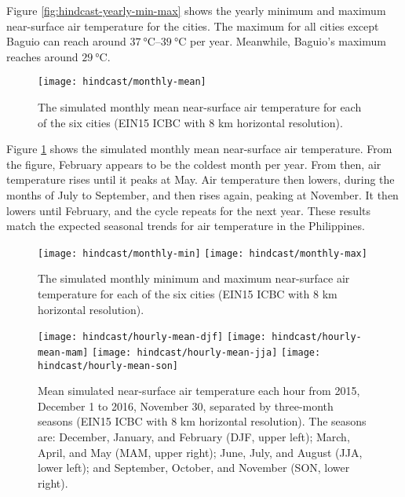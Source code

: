 		Figure \ref{fig:hindcast-yearly-min-max} shows the yearly minimum and maximum near-surface air temperature for the cities.
		The maximum for all cities except Baguio can reach around $\qtyrange{37}{39}{\degreeCelsius}$ per year.
		Meanwhile, Baguio's maximum reaches around $\qty{29}{\degreeCelsius}$. 
			
		\begin{figure}	
			\centering
			\texttt{[image: hindcast/monthly-mean]}
			\caption{
				The simulated monthly mean near-surface air temperature for each of the six cities (EIN15 ICBC with 8 km horizontal resolution).
			}
			\label{fig:hindcast-monthly-mean}
		\end{figure}
	
		Figure \ref{fig:hindcast-monthly-mean} shows the simulated monthly mean near-surface air temperature.
		From the figure, February appears to be the coldest month per year.
		From then, air temperature rises until it peaks at May.
		Air temperature then lowers, during the months of July to September,
			and then rises again, peaking at November.
		It then lowers until February, and the cycle repeats for the next year.
		These results match the expected seasonal trends for air temperature in the Philippines.
		
		\begin{figure}	
			\centering
			\texttt{[image: hindcast/monthly-min]}
			\texttt{[image: hindcast/monthly-max]}
			\caption{
				The simulated monthly minimum and maximum near-surface air temperature for each of the six cities (EIN15 ICBC with 8 km horizontal resolution).
			}
			\label{fig:hindcast-monthly-min-max}
		\end{figure}

		\begin{figure}	
			\centering
			\texttt{[image: hindcast/hourly-mean-djf]}
			\texttt{[image: hindcast/hourly-mean-mam]}
			\texttt{[image: hindcast/hourly-mean-jja]}
			\texttt{[image: hindcast/hourly-mean-son]}
			\caption{
				Mean simulated near-surface air temperature each hour from 2015, December 1 to 2016, November 30, separated by three-month seasons (EIN15 ICBC with 8 km horizontal resolution).
				The seasons are:
					December, January, and February (DJF, upper left);
					March, April, and May (MAM, upper right);
					June, July, and August (JJA, lower left);
					and
					September, October, and November (SON, lower right).
			}
			\label{fig:hindcast-hourly-mean}
		\end{figure}
	
